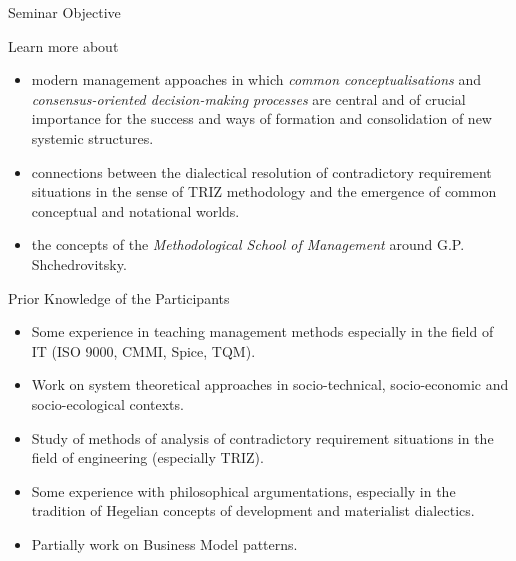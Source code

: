 \documentclass{beamer}
\title{Sustainability, Environment, Management\\[6pt] A Short Summary on our
  Seminar\\ at Leipzig University in W21 \vskip1em}
\author{Prof. Dr. Hans-Gert Gräbe\\
\url{http://www.informatik.uni-leipzig.de/~graebe}}
\date{February 04, 2022}
\begin{document}
{
\begin{frame}
  \titlepage
\end{frame}}

\begin{frame}{Seminar Objective}

  Learn more about 
  \begin{itemize}
  \item modern management appoaches in which \emph{common conceptualisations}
    and \emph{consensus-oriented decision-making processes} are central and of
    crucial importance for the success and ways of formation and consolidation
    of new systemic structures.
  \item connections between the dialectical resolution of contradictory
    requirement situations in the sense of TRIZ methodology and the emergence
    of common conceptual and notational worlds.
  \item the concepts of the \emph{Methodological School of Management} around
    G.P. Shchedrovitsky.
  \end{itemize}
\end{frame}

\begin{frame}{Prior Knowledge of the Participants}
\begin{itemize}
\item Some experience in teaching management methods especially in the field
  of IT (ISO 9000, CMMI, Spice, TQM).
\item Work on system theoretical approaches in socio-technical, socio-economic
  and socio-ecological contexts.
\item Study of methods of analysis of contradictory requirement situations in
  the field of engineering (especially TRIZ).
\item Some experience with philosophical argumentations, especially in the
  tradition of Hegelian concepts of development and materialist dialectics.
\item Partially work on Business Model patterns.
\end{itemize}
\end{frame}
\end{document}
